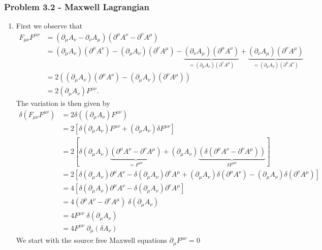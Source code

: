 \documentclass[10pt,a4paper]{article}
\theoremstyle{definition}
\begin{document}
\subsubsection{Problem 3.2 - Maxwell Lagrangian}
\begin{enumerate}
    \item First we observe that
    \begin{align}
        F_{\mu\nu}F^{\mu\nu}
        &=(\partial_\mu A_\nu-\partial_\nu A_\mu)(\partial^\mu A^\nu-\partial^\nu A^\mu)\\
        &=(\partial_\mu A_\nu)(\partial^\mu A^\nu)-(\partial_\mu A_\nu)(\partial^\nu A^\mu)-\underbrace{(\partial_\nu A_\mu)(\partial^\mu A^\nu)}_{=(\partial_\mu A_\nu)(\partial^\nu A^\mu)}+\underbrace{(\partial_\nu A_\mu)(\partial^\nu A^\mu)}_{=(\partial_\mu A_\nu)(\partial^\mu A^\nu)}\\
        &=2\left((\partial_\mu A_\nu)(\partial^\mu A^\nu)-(\partial_\mu A_\nu)(\partial^\nu A^\mu)\right)\\
        &=2(\partial_\mu A_\nu)F^{\mu\nu}.
    \end{align}
    The variation is then given by
    \begin{align}
        \delta\left(F_{\mu\nu}F^{\mu\nu}\right)
        &=2\delta\left((\partial_\mu A_\nu)F^{\mu\nu}\right)\\
        &=2\left[\delta\left(\partial_\mu A_\nu\right)F^{\mu\nu}+(\partial_\mu A_\nu)\delta F^{\mu\nu}\right]\\
        &=2[\delta\left(\partial_\mu A_\nu\right)\underbrace{(\partial^\mu A^\nu-\partial^\nu A^\mu)}_{=F^{\mu\nu}}+(\partial_\mu A_\nu)\underbrace{\left(\delta(\partial^\mu A^\nu-\partial^\nu A^\mu)\right)}_{\delta F^{\mu\nu}}]\\
        &=2\left[\delta\left(\partial_\mu A_\nu\right)\partial^\mu A^\nu-\delta\left(\partial_\mu A_\nu\right)\partial^\nu A^\mu+(\partial_\mu A_\nu)\delta(\partial^\mu A^\nu)-(\partial_\mu A_\nu)\delta(\partial^\nu A^\mu) \right]\\
        &=4\left[\delta\left(\partial_\mu A_\nu\right)\partial^\mu A^\nu-\delta\left(\partial_\mu A_\nu\right)\partial^\nu A^\mu \right]\\
        &=4(\partial^\mu A^\nu-\partial^\nu A^\mu)\;\delta(\partial_\mu A_\nu)\\
        &=4F^{\mu\nu}\;\delta(\partial_\mu A_\nu)\\
        &=4F^{\mu\nu}\;\partial_\mu(\delta A_\nu)
    \end{align}
    We start with the source free Maxwell equations $\partial_\mu F^{\mu\nu}=0$

\end{enumerate}
\end{document}
